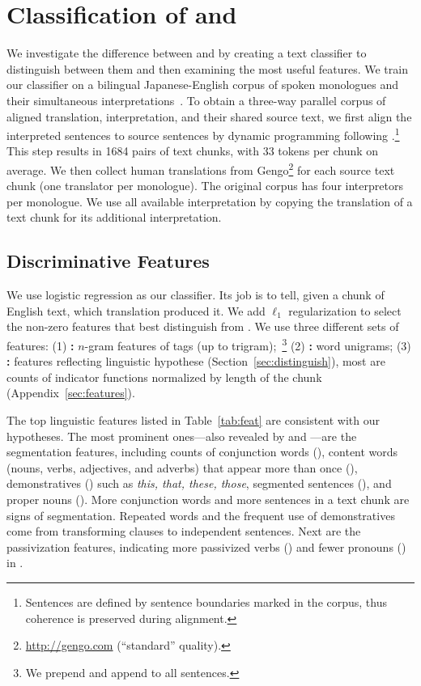 \section{Classification of \trans{} and \inter{}}
\label{sec:experiments}

We investigate the difference between \trans{} and \inter{} by
creating a text classifier to distinguish between them and then
examining the most useful features. We train our classifier on a
bilingual Japanese-English corpus of spoken monologues and their
simultaneous interpretations~\cite{ciair}.  To obtain a three-way
parallel corpus of aligned translation, interpretation, and their
shared source text, we first align the interpreted sentences to source
sentences by dynamic programming following
.\footnote{Sentences are defined by sentence
  boundaries marked in the corpus, thus coherence is preserved during
  alignment.} This step results in 1684 pairs of text chunks, with 33
tokens per chunk on average.  We then collect human translations from
Gengo\footnote{\url{http://gengo.com} (``standard'' quality).} for
each source text chunk (one translator per monologue).  The original
corpus has four interpretors per monologue. We use all available
interpretation by copying the translation of a text chunk for its
additional interpretation.

\subsection{Discriminative Features}
\label{sec:classification_results}

We use logistic regression as our classifier.  Its job is to tell, given a chunk
of English text, which translation produced it.  We add $\ell_1$ regularization
to select the non-zero features that best distinguish \inter{} from \trans{}.
We use three different sets of features: (1) \textbf{:} $n$-gram
features of  tags (up to trigram);~\footnote{We prepend \pos{\S{}} and
  append \pos{\E{}} to all sentences.}  (2) \textbf{:} word unigrams;
(3) \textbf{:} features reflecting linguistic hypothese
(Section~\ref{sec:distinguish}), most are counts of indicator functions
normalized by length of the chunk (Appendix~\ref{sec:features}).

The top linguistic features listed in Table~\ref{tab:feat} are consistent with
our hypotheses.  The most prominent ones---also revealed by  and
---are the segmentation features, including counts of conjunction words
(), content words (nouns, verbs, adjectives, and adverbs) that appear
more than once (), demonstratives () such as
\emph{this, that, these, those}, segmented sentences (), and proper
nouns ().  More conjunction words and more sentences in a text chunk
are signs of segmentation.  Repeated words and the frequent use of
demonstratives come from transforming clauses to independent sentences.
Next are the passivization features, indicating more passivized verbs
() and fewer pronouns () in \inter{}.





